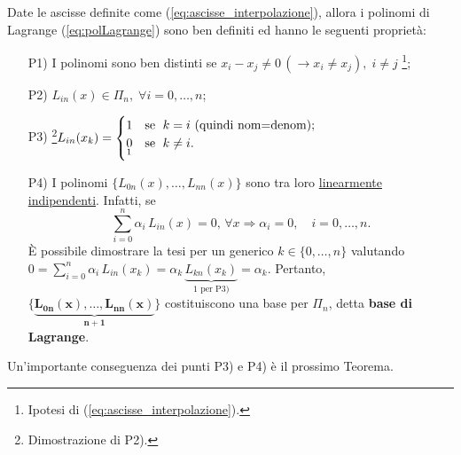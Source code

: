 \begin{property}
	Date le ascisse definite come (\ref{eq:ascisse_interpolazione}), allora i polinomi di Lagrange (\ref{eq:polLagrange}) sono ben definiti ed hanno le seguenti proprietà:
	\begin{itemize}
		\item[P1)] I polinomi sono ben distinti se $x_i-x_j\neq 0\,(\rightarrow x_i\neq x_j),\; i\neq j$ \footnote{Ipotesi di (\ref{eq:ascisse_interpolazione}).};
		\item [P2)]\footnotemark $L_{in}(x)\in\Pi_n,\; \forall i=0,\hdots,n$;
		\item[P3)]\footnote{Dimostrazione di P2).}$L_{in}(x_k)=
		\begin{cases}
			1 & \text{se $\;k=i$ (quindi nom=denom);}\\
			\underset{\footnotemark}{0} & \text{se $\;k\neq i$.}
		\end{cases}$
		\item[P4)] I polinomi $\{L_{0n}(x), \hdots, L_{nn}(x)\}$ sono tra loro \uline{linearmente indipendenti}\footnotemark.
		Infatti, se
		\begin{equation*}
			\sum_{i=0}^n \alpha_i\, L_{in}(x)=0, \, \forall x \Longrightarrow \alpha_i=0,\quad i=0,\hdots,n.
		\end{equation*}
		È possibile dimostrare la tesi per un generico $k\in \{0,\hdots,n\}$ valutando $0=\sum_{i=0}^n \alpha_i\, L_{in}(x_k)=\alpha_k\,\underbrace{L_{kn}(x_k)}_{1 \text{ per P3)}}=\alpha_k.$ Pertanto, $\boldsymbol{\{\underbrace{L_{0n}(x), \hdots,L_{nn}(x)}_{n+1}\}}$ costituiscono una base per $\Pi_n$, detta \textbf{base di Lagrange}.
	\end{itemize}
\end{property}

Un'importante conseguenza dei punti P3) e P4) è il prossimo Teorema.

